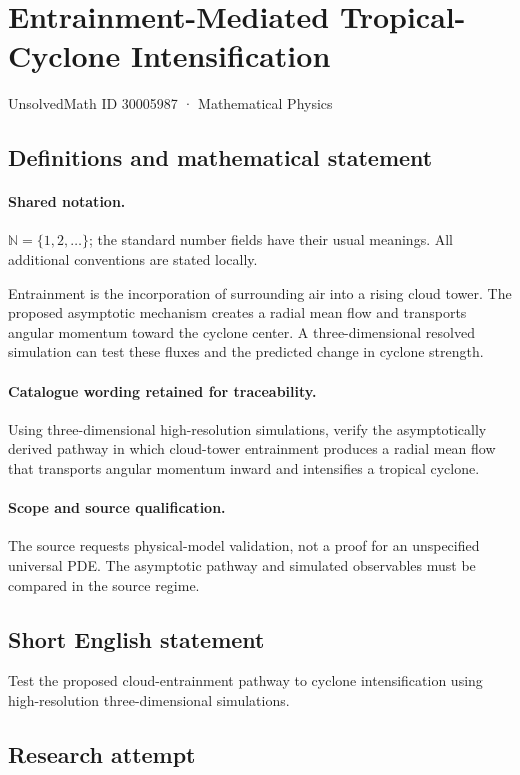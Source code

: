 \documentclass[11pt]{article}
\begin{document}
\setcounter{section}{30005986}
\section{Entrainment-Mediated Tropical-Cyclone Intensification}\label{30005987}
{\small UnsolvedMath ID 30005987 · Mathematical Physics}
\subsection{Definitions and mathematical statement}

\paragraph{Shared notation.}$\mathbb N=\{1,2,\ldots\}$; the standard number fields have their usual meanings. All additional conventions are stated locally.


Entrainment is the incorporation of surrounding air into a rising cloud tower. The proposed asymptotic mechanism creates a radial mean flow and transports angular momentum toward the cyclone center. A three-dimensional resolved simulation can test these fluxes and the predicted change in cyclone strength.

\paragraph{Catalogue wording retained for traceability.}
Using three-dimensional high-resolution simulations, verify the asymptotically derived pathway in which cloud-tower entrainment produces a radial mean flow that transports angular momentum inward and intensifies a tropical cyclone.

\paragraph{Scope and source qualification.}The source requests physical-model validation, not a proof for an unspecified universal PDE. The asymptotic pathway and simulated observables must be compared in the source regime.
\subsection{Short English statement}
Test the proposed cloud-entrainment pathway to cyclone intensification using high-resolution three-dimensional simulations.
\subsection{Research attempt}
\end{document}
